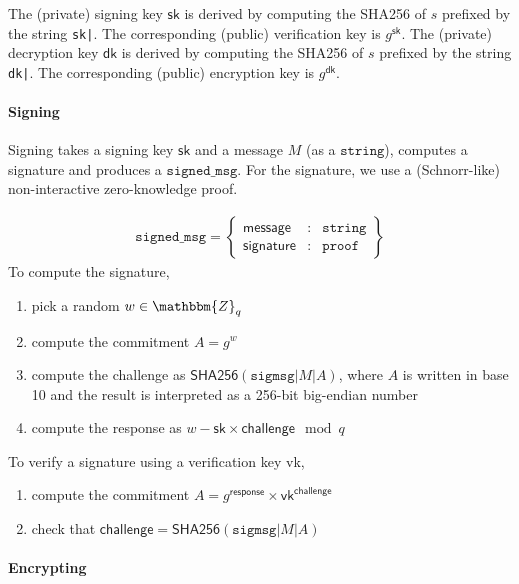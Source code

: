 \documentclass[a4paper]{article}
\newcommand{\Z}{\mathbbm{Z}}
\newcommand{\jstring}{\texttt{string}}
\begin{document}
The (private) signing key $\textsf{sk}$ is derived by computing the
SHA256 of $s$ prefixed by the string \verb/sk|/. The corresponding
(public) verification key is $g^{\textsf{sk}}$. The (private)
decryption key $\textsf{dk}$ is derived by computing the SHA256 of $s$
prefixed by the string \verb/dk|/. The corresponding (public)
encryption key is $g^{\textsf{dk}}$.

\paragraph{Signing}

Signing takes a signing key $\textsf{sk}$ and a \textsf{message} $M$
(as a $\jstring$), computes a \textsf{signature} and produces a
$\texttt{signed\_msg}$. For the signature, we use a (Schnorr-like)
non-interactive zero-knowledge proof.

\begin{gather*}
  \texttt{signed\_msg}=\left\{
    \begin{array}{rcl}
      \textsf{message}&:&\jstring\\
      \textsf{signature}&:&\texttt{proof}
    \end{array}
  \right\}
\end{gather*}
To compute the \textsf{signature},
\begin{enumerate}
\item pick a random $w\in\Z_q$
\item compute the commitment $A=g^w$
\item compute the \textsf{challenge} as
  $\textsf{SHA256}(\texttt{sigmsg|}M\texttt{|}A)$, where $A$ is written
  in base 10 and the result is interpreted as a 256-bit big-endian
  number
\item compute the \textsf{response} as
  $w-\textsf{sk}\times\textsf{challenge}\mod q$
\end{enumerate}
To verify a \textsf{signature} using a verification key \textsf{vk},
\begin{enumerate}
\item compute the commitment $A=g^{\textsf{response}}\times\textsf{vk}^{\textsf{challenge}}$
\item check that $\textsf{challenge}=\textsf{SHA256}(\texttt{sigmsg|}M\texttt{|}A)$
\end{enumerate}

\paragraph{Encrypting}
\end{document}
